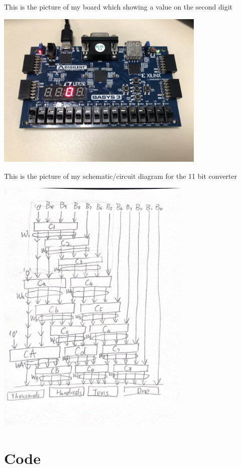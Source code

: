 \documentclass[11pt]{article}
\begin{document}
	This is the picture of my board which showing a value on the second digit\\	
	\begin{center}
		\includegraphics[width=0.75\textwidth]{board2}
	\end{center}
	
	This is the picture of my schematic/circuit diagram for the 11 bit converter\\
	\begin{center}
		\includegraphics[width=0.7\textwidth]{bcd11bit_schematic}
	\end{center}



\section*{Code}
	
\end{document}

